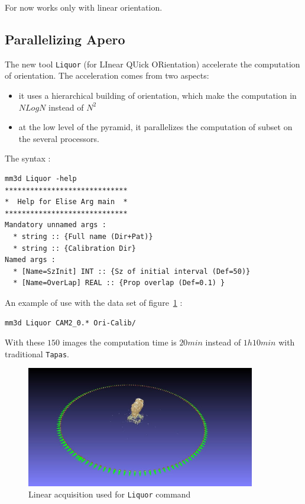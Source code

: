 For now works only with linear orientation.

\subsection{Parallelizing Apero}

The new tool {\tt Liquor} (for LInear QUick ORientation) accelerate the computation of orientation. The acceleration comes
from two aspects:

\begin{itemize}
   \item  it uses a hierarchical building of orientation, which make the computation in $N Log N$ instead of $N^2$
   \item  at the low level of the pyramid, it parallelizes the computation of subset on the several processors.
\end{itemize}

The syntax :

\begin{verbatim}
mm3d Liquor -help
*****************************
*  Help for Elise Arg main  *
*****************************
Mandatory unnamed args :
  * string :: {Full name (Dir+Pat)}
  * string :: {Calibration Dir}
Named args :
  * [Name=SzInit] INT :: {Sz of initial interval (Def=50)}
  * [Name=OverLap] REAL :: {Prop overlap (Def=0.1) }
\end{verbatim}

An example of use with the data set of figure~\ref{FIG:Liquor:DataMap} :

\begin{verbatim}
mm3d Liquor CAM2_0.* Ori-Calib/
\end{verbatim}


With these $150$ images the computation time is $20 min$ instead of $1h10min$ with traditional {\tt Tapas}.

\begin{figure}[H]
\begin{center}
\includegraphics[width=100mm]{FIGS/Ange/LineAcq.jpg}
\end{center}
\caption{Linear acquisition used for {\tt Liquor} command}
\label{FIG:Liquor:DataMap}
\end{figure}


